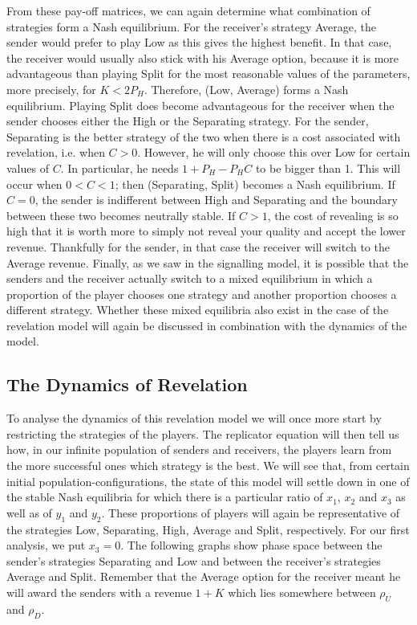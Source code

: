 \documentclass[a4paper,10pt]{article}
\numberwithin{equation}{section}
\begin{document}
From these pay-off matrices, we can again determine what combination of strategies form a Nash equilibrium. For the receiver's strategy Average, the sender would prefer to play Low as this gives the highest benefit. In that case, the receiver would usually also stick with his Average option, because it is more advantageous than playing Split for the most reasonable values of the parameters, more precisely, for $K<2 P_H$. Therefore, (Low, Average) forms a Nash equilibrium. Playing Split does become advantageous for the receiver when the sender chooses either the High or the Separating strategy. For the sender, Separating is the better strategy of the two when there is a cost associated with revelation, i.e. when $C>0$. However, he will only choose this over Low for certain values of $C$. In particular, he needs $1+P_H-P_H C$ to be bigger than 1. This will occur when $0<C<1$; then (Separating, Split) becomes a Nash equilibrium. If $C=0$, the sender is indifferent between High and Separating and the boundary between these two becomes neutrally stable. If $C>1$, the cost of revealing is so high that it is worth more to simply not reveal your quality and accept the lower revenue. Thankfully for the sender, in that case the receiver will switch to the Average revenue. Finally, as we saw in the signalling model, it is possible that the senders and the receiver actually switch to a mixed equilibrium in which a proportion of the player chooses one strategy and another proportion chooses a different strategy. Whether these mixed equilibria also exist in the case of the revelation model will again be discussed in combination with the dynamics of the model.

\subsection{The Dynamics of Revelation}
\label{sec:The Dynamics of Revelation}

To analyse the dynamics of this revelation model we will once more start by restricting the strategies of the players. The replicator equation will then tell us how, in our infinite population of senders and receivers, the players learn from the more successful ones which strategy is the best. We will see that, from certain initial population-configurations, the state of this model will settle down in one of the stable Nash equilibria for which there is a particular ratio of $x_1$, $x_2$ and $x_3$ as well as of $y_1$ and $y_2$. These proportions of players will again be representative of the strategies Low, Separating, High, Average and Split, respectively. For our first analysis, we put $x_3=0$. The following graphs show phase space between the sender's strategies Separating and Low and between the receiver's strategies Average and Split. Remember that the Average option for the receiver meant he will award the senders with a revenue $1+K$ which lies somewhere between $\rho_U$ and $\rho_D$.
 
\end{document}
